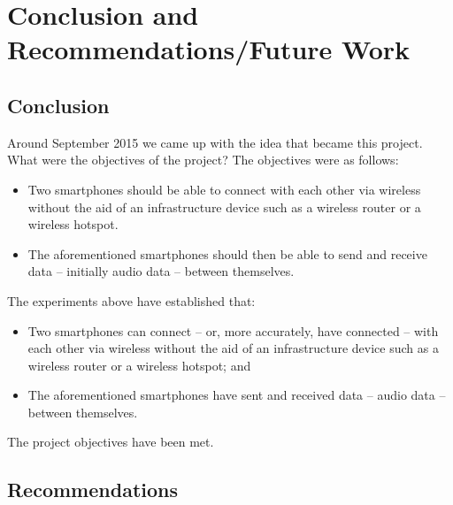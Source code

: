 \documentclass[12pt,svgnames,smaller]{article} %
\begin{document}


\section{Conclusion and Recommendations/Future Work}
	
	\subsection{Conclusion}
	
	Around September 2015 we came up with the idea that became this project. What were the objectives of the project? The objectives were as follows:
	
	\begin{itemize}
		\item Two smartphones should be able to connect with each other via wireless without the aid of an infrastructure device such as a wireless router or a wireless hotspot.
		\item The aforementioned smartphones should then be able to send and receive data – initially audio data – between themselves.
	\end{itemize}
	
	The experiments above have established that:
	
	\begin{itemize}
		\item 	Two smartphones can connect – or, more accurately, have connected –  with each other via wireless without the aid of an infrastructure device such as a wireless router or a wireless hotspot; and
		\item The aforementioned smartphones have sent and received data – audio data – between themselves.
	\end{itemize}
	
	The project objectives have been met.
	
	
	
	\subsection{Recommendations}
	
\end{document}
